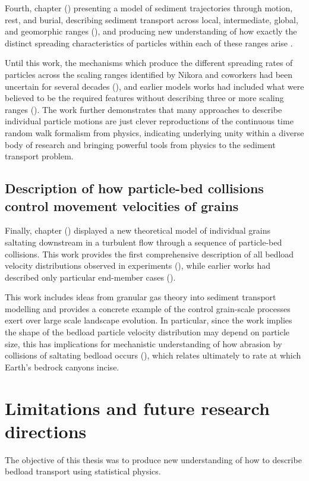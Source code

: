 Fourth, chapter () presenting a model of sediment trajectories through motion, rest, and burial, describing sediment transport across local, intermediate, global, and geomorphic ranges (), and producing new understanding of how exactly the distinct spreading characteristics of particles within each of these ranges arise \citep[e.g][]{Pretzslav2021}.

Until this work, the mechanisms which produce the different spreading rates of particles across the scaling ranges identified by Nikora and coworkers had been uncertain for several decades (), and earlier models works had included what were believed to be the required features without describing three or more scaling ranges (). 
The work further demonstrates that many approaches to describe individual particle motions are just clever reproductions of the continuous time random walk formalism from physics, indicating underlying unity within a diverse body of research and bringing powerful tools from physics to the sediment transport problem.

\subsection{Description of how particle-bed collisions control movement velocities of grains}

Finally, chapter () displayed a new theoretical model of individual grains saltating downstream in a turbulent flow through a sequence of particle-bed collisions.
This work provides the first comprehensive description of all bedload velocity distributions observed in experiments (), while earlier works had described only particular end-member cases ().

This work includes ideas from granular gas theory into sediment transport modelling and provides a concrete example of the control grain-scale processes exert over large scale landscape evolution. In particular, since the work implies the shape of the bedload particle velocity distribution may depend on particle size, this has implications for mechanistic understanding of how abrasion by collisions of saltating bedload occurs (), which relates ultimately to rate at which Earth's bedrock canyons incise.

\section{Limitations and future research directions}

The objective of this thesis was to produce new understanding of how to describe bedload transport using statistical physics.


